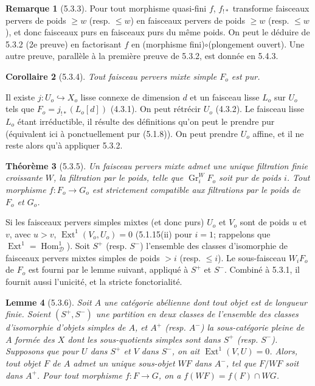 \documentclass[12pt,a4paper]{article}
\theoremstyle{plain}
\newtheorem{theorem}{Th\'eor\`eme}[section]
\newtheorem{lemma}[theorem]{Lemme}
\newtheorem{corollary}[theorem]{Corollaire}
\theoremstyle{definition}
\newtheorem{remark}[theorem]{Remarque}
\theoremstyle{remark}
\DeclareMathOperator{\Hom}{Hom}
\DeclareMathOperator{\Ext}{Ext}
\DeclareMathOperator{\Gr}{Gr}
\newcommand{\cD}{\mathcal{D}}
\begin{document}
\begin{remark}[5.3.3]
Pour tout morphisme quasi-fini $f$, $f_{!*}$ transforme faisceaux pervers de poids $\geq w$ (resp. $\leq w$) en faisceaux pervers de poids $\geq w$ (resp. $\leq w$), et donc faisceaux purs en faisceaux purs du m\^eme poids. On peut le d\'eduire de 5.3.2 (2e preuve) en factorisant $f$ en (morphisme fini)$\circ$(plongement ouvert). Une autre preuve, parall\`ele \`a la premi\`ere preuve de 5.3.2, est donn\'ee en 5.4.3.
\end{remark}

\begin{corollary}[5.3.4]
Tout faisceau pervers mixte simple $F_o$ est pur.
\end{corollary}

Il existe $j: U_o \hookrightarrow X_o$ lisse connexe de dimension $d$ et un faisceau lisse $L_o$ sur $U_o$ tels que $F_o = j_{!*}(L_o[d])$ (4.3.1). On peut r\'etr\'ecir $U_o$ (4.3.2). Le faisceau lisse $L_o$ \'etant irr\'eductible, il r\'esulte des d\'efinitions qu'on peut le prendre pur (\'equivalent ici \`a ponctuellement pur (5.1.8)). On peut prendre $U_o$ affine, et il ne reste alors qu'\`a appliquer 5.3.2.

\begin{theorem}[5.3.5]
Un faisceau pervers mixte admet une unique filtration finie croissante $W$, la filtration par le poids, telle que $\Gr_i^W F_o$ soit pur de poids $i$. Tout morphisme $f: F_o \to G_o$ est strictement compatible aux filtrations par le poids de $F_o$ et $G_o$.
\end{theorem}

Si les faisceaux pervers simples mixtes (et donc purs) $U_o$ et $V_o$ sont de poids $u$ et $v$, avec $u > v$, $\Ext^1(V_o, U_o) = 0$ (5.1.15(ii) pour $i=1$; rappelons que $\Ext^1 = \Hom^1_{\cD}$). Soit $S^+$ (resp. $S^-$) l'ensemble des classes d'isomorphie de faisceaux pervers mixtes simples de poids $> i$ (resp. $\leq i$). Le sous-faisceau $W_iF_o$ de $F_o$ est fourni par le lemme suivant, appliqu\'e \`a $S^+$ et $S^-$. Combin\'e \`a 5.3.1, il fournit aussi l'unicit\'e, et la stricte fonctorialit\'e.

\begin{lemma}[5.3.6]
Soit $A$ une cat\'egorie ab\'elienne dont tout objet est de longueur finie. Soient $(S^+, S^-)$ une partition en deux classes de l'ensemble des classes d'isomorphie d'objets simples de $A$, et $A^+$ (resp. $A^-$) la sous-cat\'egorie pleine de $A$ form\'ee des $X$ dont les sous-quotients simples sont dans $S^+$ (resp. $S^-$). Supposons que pour $U$ dans $S^+$ et $V$ dans $S^-$, on ait $\Ext^1(V,U) = 0$. Alors, tout objet $F$ de $A$ admet un unique sous-objet $WF$ dans $A^-$, tel que $F/WF$ soit dans $A^+$. Pour tout morphisme $f: F \to G$, on a $f(WF) = f(F) \cap WG$.
\end{lemma}
\end{document}
